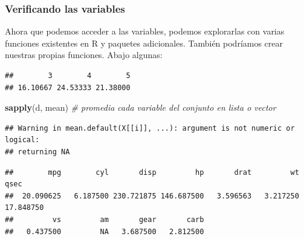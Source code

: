 \documentclass[
]{article}
\newenvironment{Shaded}{\begin{snugshade}}{\end{snugshade}}
\newcommand{\CommentTok}[1]{\textcolor[rgb]{0.56,0.35,0.01}{\textit{#1}}}
\newcommand{\FunctionTok}[1]{\textcolor[rgb]{0.13,0.29,0.53}{\textbf{#1}}}
\newcommand{\NormalTok}[1]{#1}
\newcommand{\SpecialCharTok}[1]{\textcolor[rgb]{0.81,0.36,0.00}{\textbf{#1}}}
\begin{document}
\subsubsection{Verificando las
variables}\label{verificando-las-variables}

Ahora que podemos acceder a las variables, podemos explorarlas con
varias funciones existentes en R y paquetes adicionales. También
podríamos crear nuestras propias funciones. Abajo algunas:

\begin{Shaded}
\end{Shaded}

\begin{verbatim}
##        3        4        5 
## 16.10667 24.53333 21.38000
\end{verbatim}

\begin{Shaded}
\begin{Highlighting}[]
\FunctionTok{sapply}\NormalTok{(d, mean) }\CommentTok{\# promedia cada variable del conjunto en lista o vector}
\end{Highlighting}
\end{Shaded}

\begin{verbatim}
## Warning in mean.default(X[[i]], ...): argument is not numeric or logical:
## returning NA
\end{verbatim}

\begin{verbatim}
##        mpg        cyl       disp         hp       drat         wt       qsec 
##  20.090625   6.187500 230.721875 146.687500   3.596563   3.217250  17.848750 
##         vs         am       gear       carb 
##   0.437500         NA   3.687500   2.812500
\end{verbatim}

\begin{Shaded}
\end{Shaded}
\end{document}
